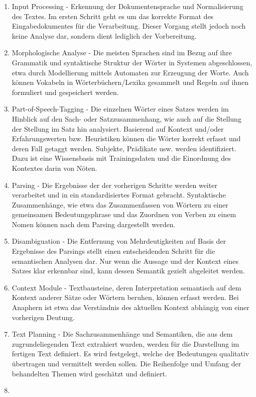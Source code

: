 \documentclass[12pt]{paper}
\begin{document}
\begin{enumerate}
\item
Input Processing - Erkennung der Dokumentensprache und Normalisierung des Textes. Im ersten Schritt geht es um das korrekte Format des Eingabedokumentes für die Verarbeitung. Dieser Vorgang stellt jedoch noch keine Analyse dar, sondern dient lediglich der Vorbereitung.
\item
Morphologische Analyse - Die meisten Sprachen sind im Bezug auf ihre Grammatik und syntaktische Struktur der Wörter in Systemen abgeschlossen, etwa durch Modellierung mittels Automaten zur Erzeugung der Worte. Auch können Vokabeln in Wörterbüchern/Lexika gesammelt und Regeln auf ihnen formuliert und gespeichert werden.
\item
Part-of-Speech-Tagging - Die einzelnen Wörter eines Satzes werden im Hinblick auf den Sach- oder Satzzusammenhang, wie auch auf die Stellung der Stellung im Satz hin analysiert. Basierend auf Kontext und/oder Erfahrungswerten bzw. Heuristiken können die Wörter korrekt erfasst und deren Fall getaggt werden. Subjekte, Prädikate usw. werden identifiziert. Dazu ist eine Wissensbasis mit Trainingsdaten und die Einordnung des Kontextes darin von Nöten.
\item
Parsing - Die Ergebnisse der  der vorherigen Schritte werden weiter verarbeitet und in ein standardisiertes Format gebracht. Syntaktische Zusammenhänge, wie etwa das Zusammenfassen von Wörtern zu einer gemeinsamen Bedeutungsphrase und das Zuordnen von Verben zu einem Nomen können nach dem Parsing dargestellt werden.
\item
Disambiguation - Die Entfernung von Mehrdeutigkeiten auf Basis der Ergebnisse des Parsings stellt einen entscheidenden Schritt für die semantischen Analysen dar. Nur wenn die Aussage und der Kontext eines Satzes klar erkennbar sind, kann dessen Semantik gezielt abgeleitet werden.
\item
Context Module - Textbausteine, deren Interpretation semantisch auf dem Kontext anderer Sätze oder Wörtern beruhen, können erfasst werden. Bei Anaphern ist etwa das Verständnis des aktuellen Kontext abhängig von einer vorherigen Deutung.
\item
Text Planning - Die Sachzusammenhänge und Semantiken, die aus dem zugrundeliegenden Text extrahiert wurden, werden für die Darstellung im fertigen Text definiert. Es wird festgelegt, welche der Bedeutungen qualitativ übertragen und vermittelt werden sollen. Die Reihenfolge und Umfang der behandelten Themen wird geschätzt und definiert.
\item

\end{enumerate}
\end{document}
